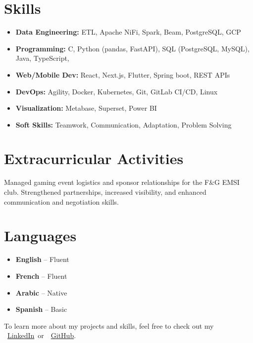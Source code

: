 \documentclass[12pt,a4paper,sans]{moderncv}
\begin{document}
    \section{Skills}
    \begin{itemize}[leftmargin=0.5cm, itemsep=0pt, topsep=0pt]
    \item \textbf{Data Engineering:} ETL, Apache NiFi, Spark, Beam, PostgreSQL, GCP
    \item \textbf{Programming:} C, Python (pandas, FastAPI), SQL (PostgreSQL, MySQL), Java, TypeScript, 
    \item \textbf{Web/Mobile Dev:} React, Next.js, Flutter, Spring boot, REST APIs
    \item \textbf{DevOps:} Agility, Docker, Kubernetes, Git, GitLab CI/CD, Linux
    \item \textbf{Visualization:} Metabase, Superset, Power BI
    \item \textbf{Soft Skills:} Teamwork, Communication, Adaptation, Problem Solving
    \end{itemize}


    \section{Extracurricular Activities}
    Managed gaming event logistics and sponsor relationships for the F\&G EMSI club. Strengthened partnerships, increased visibility, and enhanced communication and negotiation skills.

    \section{Languages}
    \begin{multicols}{2}
    \begin{itemize}[leftmargin=0.7cm, itemsep=2pt, topsep=2pt]
        \item \textbf{English} – Fluent
        \item \textbf{French} – Fluent
        \item \textbf{Arabic} – Native
        \item \textbf{Spanish} – Basic
    \end{itemize}
    \end{multicols}

\vspace{1em}
\begin{center}
    {\footnotesize\color{gray}
    To learn more about my projects and skills, feel free to check out my~
    \faLinkedin~\href{https://www.linkedin.com/in/ahmed-makroum/}{LinkedIn}~or~\faGithub~\href{https://github.com/ahmedmakroum}{GitHub}.}
\end{center}
\end{document}
